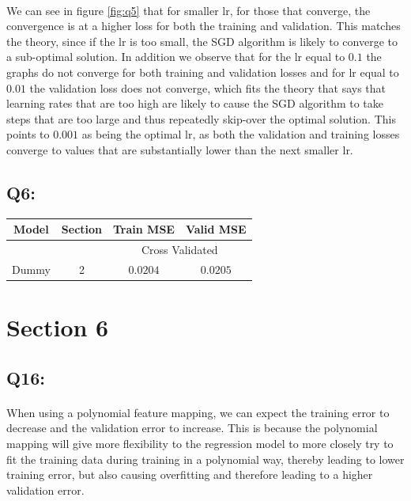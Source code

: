 \documentclass{article}
\begin{document}
    \paragraph*{}
    We can see in figure \ref{fig:q5} that for smaller lr, for those that converge, the convergence is at a higher loss for both the training and validation. This matches the theory, since if the lr is too small, the SGD algorithm is likely to converge to a sub-optimal solution. In addition we observe that for the lr equal to $0.1$ the graphs do not converge for both training and validation losses and for lr equal to $0.01$ the validation loss does not converge, which fits the theory that says that learning rates that are too high are likely to cause the SGD algorithm to take steps that are too large and thus repeatedly skip-over the optimal solution. This points to $0.001$ as being the optimal lr, as both the validation and training losses converge to values that are substantially lower than the next smaller lr.
\subsection*{Q6:}
    \begin{center}
        \begin{tabular}{|c|c|c|c|}
            \hline
            \rowcolor{gray!60}
            Model & Section & Train MSE & Valid MSE\\ \hline
            \rowcolor{gray!20}
            ~&~ & \multicolumn{2}{c|}{Cross Validated}\\ \hline
            Dummy & 2 & $0.0204$ & $0.0205$\\ \hline
        \end{tabular}
    \end{center}
\section*{Section 6}
\subsection*{Q16:}
    \paragraph*{}
    When using a polynomial feature mapping, we can expect the training error to decrease and the validation error to increase. This is because the polynomial mapping will give more flexibility to the regression model to more closely try to fit the training data during training in a polynomial way, thereby leading to lower training error, but also causing overfitting and therefore leading to a higher validation error.
\end{document}
